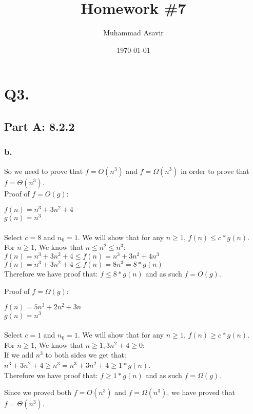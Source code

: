 \documentclass[titlepage]{article}\pagestyle{empty}
\author{Muhammad Asavir}
\title{Homework \#7}
\date{\today}
\begin{document}
\maketitle

\pagebreak
\section*{Q3.}
\subsection*{Part A: 8.2.2}
\subsubsection*{b.} 
So we need to prove that $f = O(n^3)$ and $f = \Omega(n^3)$ in order to prove that $f = \Theta(n^3)$.\\
Proof of $f = O(g)$:
\begin{center}
$f(n) = n^3 + 3n^2 + 4$\\
$g(n) = n^3$\\~\\
Select $c = 8$ and $n_0 = 1$. We will show that for any $n \geq 1$, $f(n) \leq c * g(n).$\\
For $n \geq 1$, We know that $n \leq n^2 \leq n^3$: \\
$f(n) = n^3 + 3n^2 + 4 \leq f(n) = n^3 + 3n^2 + 4n^3$\\
$f(n) = n^3 + 3n^2 + 4 \leq f(n) = 8n^3 = 8 * g(n)$\\
Therefore we have proof that: $f \leq 8 * g(n)$ and as such $f = O(g)$.
\end{center}
Proof of $f = \Omega(g)$:
\begin{center}
$f(n) = 5n^3 + 2n^2 + 3n$\\
$g(n) = n^3$\\~\\
Select $c = 1$ and $n_0 = 1$. We will show that for any $n \geq 1$, $f(n) \geq c * g(n).$\\
For $n \geq 1$, We know that $n \geq 1, 3n^2 + 4 \geq 0$: \\
If we add $n^3$ to both sides we get that:\\
$n^3 + 3n^2 + 4 \geq n^3 = n^3 + 3n^2 + 4 \geq 1 * g(n)$.\\
Therefore we have proof that: $f \geq 1 * g(n)$ and as such $f = \Omega(g)$.\\
\end{center}

Since we proved both $f = O(n^3)$ and $f = \Omega(n^3)$, we have proved that $f = \Theta(n^3)$.
\end{document}
